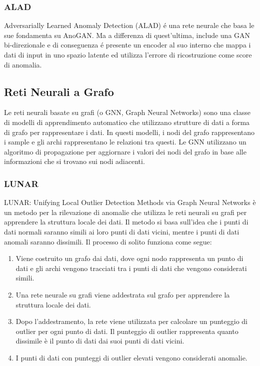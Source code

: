 \subsubsection{ALAD}
Adversarially Learned Anomaly Detection (ALAD) é una rete neurale che basa le sue fondamenta su AnoGAN. Ma a differenza di quest'ultima, include una GAN bi-direzionale e di conseguenza é presente un encoder al suo interno che mappa i dati di input in uno spazio latente ed utilizza l'errore di ricostruzione come score di anomalia.

\subsection{Reti Neurali a Grafo}
Le reti neurali basate su grafi (o GNN, Graph Neural Networks) sono una classe di modelli di apprendimento automatico che utilizzano strutture di dati a forma di grafo per rappresentare i dati. In questi modelli, i nodi del grafo rappresentano i sample e gli archi rappresentano le relazioni tra questi. Le GNN utilizzano un algoritmo di propagazione per aggiornare i valori dei nodi del grafo in base alle informazioni che si trovano sui nodi adiacenti.

\subsubsection{LUNAR}
LUNAR: Unifying Local Outlier Detection Methods via Graph Neural Networks è un metodo per la rilevazione di anomalie che utilizza le reti neurali su grafi per apprendere la struttura locale dei dati. Il metodo si basa sull'idea che i punti di dati normali saranno simili ai loro punti di dati vicini, mentre i punti di dati anomali saranno dissimili.
Il processo di solito funziona come segue:
\begin{enumerate}
\item Viene costruito un grafo dai dati, dove ogni nodo rappresenta un punto di dati e gli archi vengono tracciati tra i punti di dati che vengono considerati simili.
\item Una rete neurale su grafi viene addestrata sul grafo per apprendere la struttura locale dei dati.
\item Dopo l'addestramento, la rete viene utilizzata per calcolare un punteggio di outlier per ogni punto di dati. Il punteggio di outlier rappresenta quanto dissimile è il punto di dati dai suoi punti di dati vicini.
\item I punti di dati con punteggi di outlier elevati vengono considerati anomalie.

\end{enumerate}

